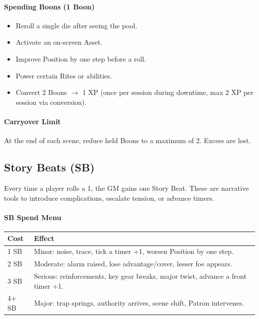 \paragraph{Spending Boons (1 Boon)}
\begin{itemize}
    \item Reroll a single die after seeing the pool.
    \item Activate an on‑screen Asset.
    \item Improve Position by one step before a roll.
    \item Power certain Rites or abilities.
    \item Convert 2 Boons $\rightarrow$ 1 XP (once per session during downtime,
        max 2 XP per session via conversion).
\end{itemize}

\paragraph{Carryover Limit} At the end of each scene, reduce held Boons to a
maximum of 2. Excess are lost.

\subsection{Story Beats (SB)}\label{subsec:story_beats}

Every time a player rolls a 1, the GM gains one Story Beat. These are narrative
tools to introduce complications, escalate tension, or advance timers.

\paragraph{SB Spend Menu}\label{sec:sb_spend_menu}
\begin{center}
\begin{tabular}{ll}
\toprule
\textbf{Cost} & \textbf{Effect} \\
\midrule
1 SB & Minor: noise, trace, tick a timer +1, worsen Position by one step. \\
2 SB & Moderate: alarm raised, lose advantage/cover, lesser foe appears. \\
3 SB & Serious: reinforcements, key gear breaks, major twist, advance a front timer +1. \\
4+ SB & Major: trap springs, authority arrives, scene shift, Patron intervenes. \\
\bottomrule
\end{tabular}
\end{center}

